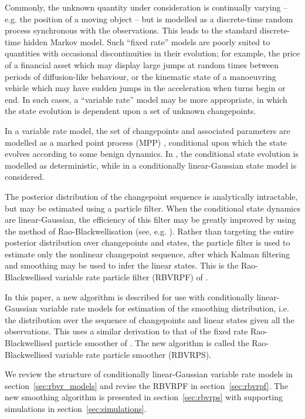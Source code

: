 \documentclass[journal]{IEEEtran}
\begin{document}
Commonly, the unknown quantity under consideration is continually varying -- e.g. the position of a moving object -- but is modelled as a discrete-time random process synchronous with the observations. This leads to the standard discrete-time hidden Markov model. Such ``fixed rate'' models are poorly suited to quantities with occasional discontinuities in their evolution; for example, the price of a financial asset which may display large jumps at random times between periods of diffusion-like behaviour, or the kinematic state of a manoeuvring vehicle which may have sudden jumps in the acceleration when turns begin or end. In such cases, a ``variable rate'' model may be more appropriate, in which the state evolution is dependent upon a set of unknown changepoints.

In a variable rate model, the set of changepoints and associated parameters are modelled as a marked point process (MPP) \cite{Jacobsen2006}, conditional upon which the state evolves according to some benign dynamics. In \cite{Godsill2007,Whiteley2011}, the conditional state evolution is modelled as deterministic, while in \cite{Godsill2007a,Christensen2012} a conditionally linear-Gaussian state model is considered.

The posterior distribution of the changepoint sequence is analytically intractable, but may be estimated using a particle filter. When the conditional state dynamics are linear-Gaussian, the efficiency of this filter may be greatly improved by using the method of Rao-Blackwellisation (see, e.g. \cite{Casella1996,Doucet2000}). Rather than targeting the entire posterior distribution over changepoints and states, the particle filter is used to estimate only the nonlinear changepoint sequence, after which Kalman filtering and smoothing may be used to infer the linear states. This is the Rao-Blackwellised variable rate particle filter (RBVRPF) of \cite{Godsill2007a,Christensen2012}.

In this paper, a new algorithm is described for use with conditionally linear-Gaussian variable rate models for estimation of the smoothing distribution, i.e. the distribution over the sequence of changepoints and linear states given all the observations. This uses a similar derivation to that of the fixed rate Rao-Blackwellised particle smoother of \cite{Sarkka2012}. The new algorithm is called the Rao-Blackwellised variable rate particle smoother (RBVRPS).

We review the structure of conditionally linear-Gaussian variable rate models in section~\ref{sec:rbvr_models} and revise the RBVRPF in section~\ref{sec:rbvrpf}. The new smoothing algorithm is presented in section~\ref{sec:rbvrps} with supporting simulations in section~\ref{sec:simulations}.
\end{document}
